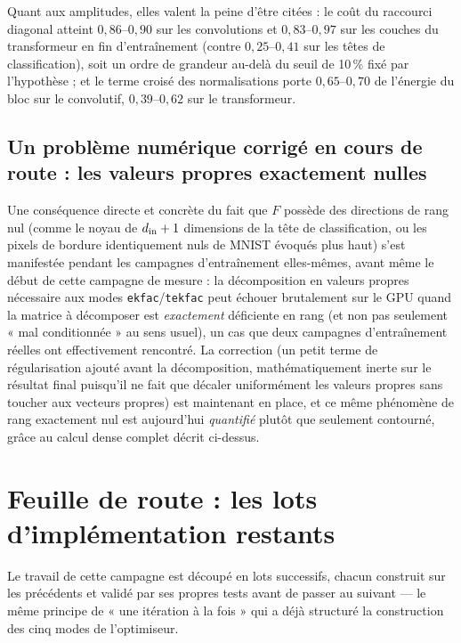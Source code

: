 \documentclass[11pt,a4paper]{article}
\begin{document}
Quant aux amplitudes, elles valent la peine d'être citées : le coût du raccourci diagonal atteint
$0{,}86$--$0{,}90$ sur les convolutions et $0{,}83$--$0{,}97$ sur les couches du transformeur en fin
d'entraînement (contre $0{,}25$--$0{,}41$ sur les têtes de classification), soit un ordre de grandeur
au-delà du seuil de 10\,\% fixé par l'hypothèse ; et le terme croisé des normalisations porte
$0{,}65$--$0{,}70$ de l'énergie du bloc sur le convolutif, $0{,}39$--$0{,}62$ sur le transformeur.

\subsection{Un problème numérique corrigé en cours de route : les valeurs propres exactement nulles}

Une conséquence directe et concrète du fait que $F$ possède des directions de rang nul (comme le
noyau de $d_{\rm in}+1$ dimensions de la tête de classification, ou les pixels de bordure
identiquement nuls de MNIST évoqués plus haut) s'est manifestée pendant les campagnes
d'entraînement elles-mêmes, avant même le début de cette campagne de mesure : la décomposition en
valeurs propres nécessaire aux modes \texttt{ekfac}/\texttt{tekfac} peut échouer brutalement sur le
GPU quand la matrice à décomposer est \emph{exactement} déficiente en rang (et non pas seulement
« mal conditionnée » au sens usuel), un cas que deux campagnes d'entraînement réelles ont
effectivement rencontré. La correction (un petit terme de régularisation ajouté avant la
décomposition, mathématiquement inerte sur le résultat final puisqu'il ne fait que décaler
uniformément les valeurs propres sans toucher aux vecteurs propres) est maintenant en place, et ce
même phénomène de rang exactement nul est aujourd'hui \emph{quantifié} plutôt que seulement contourné,
grâce au calcul dense complet décrit ci-dessus.

\section{Feuille de route : les lots d'implémentation restants}

Le travail de cette campagne est découpé en lots successifs, chacun construit sur les précédents et
validé par ses propres tests avant de passer au suivant — le même principe de « une itération à la
fois » qui a déjà structuré la construction des cinq modes de l'optimiseur.
\end{document}
